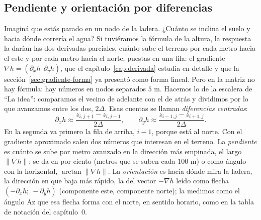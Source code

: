 \subsection{Pendiente y orientación por diferencias}\label{sec:terreno-pendiente}

Imaginá que estás parado en un nodo de la ladera. ¿Cuánto se inclina el suelo y hacia dónde
correría el agua? Si tuviéramos la fórmula de la altura, la respuesta la darían las dos
derivadas parciales, cuánto sube el terreno por cada metro hacia el este y por cada metro hacia
el norte, puestas en una fila: el gradiente \(\nabla h=(\partial_xh\ \ \partial_yh)\), que el
capítulo~\ref{cap:derivada} estudia en detalle y que la sección~\ref{sec:gradiente-forma} ya
presentó como forma lineal. Pero en la matriz no hay fórmula: hay números en nodos separados
\(5\) m. Hacemos lo de la escalera de \enquote{La idea}: comparamos el vecino de adelante con el
de atrás y dividimos por lo que avanzamos entre los dos, \(2\Delta\). Esas cuentas se llaman
\emph{diferencias centradas}:
\[
  \partial_xh\approx\frac{z_{i,j+1}-z_{i,j-1}}{2\Delta},\qquad
  \partial_yh\approx\frac{z_{i-1,j}-z_{i+1,j}}{2\Delta}.
\]
En la segunda va primero la fila de arriba, \(i-1\), porque está al norte. Con el gradiente
aproximado salen dos números que interesan en el terreno. La \emph{pendiente} es cuánto se sube
por metro avanzado en la dirección más empinada, el largo \(\lVert\nabla h\rVert\); se da en
por ciento (metros que se suben cada \(100\) m) o como ángulo con la horizontal,
\(\arctan\lVert\nabla h\rVert\). La \emph{orientación} es hacia dónde mira la ladera, la
dirección en que baja más rápido, la del vector \(-\nabla h\) leído como flecha
\((-\partial_xh;\ -\partial_yh)\) (componente este, componente norte); la medimos como el
ángulo \(\mathrm{Az}\) que esa flecha forma con el norte, en sentido horario, como en la tabla
de notación del capítulo~0.

